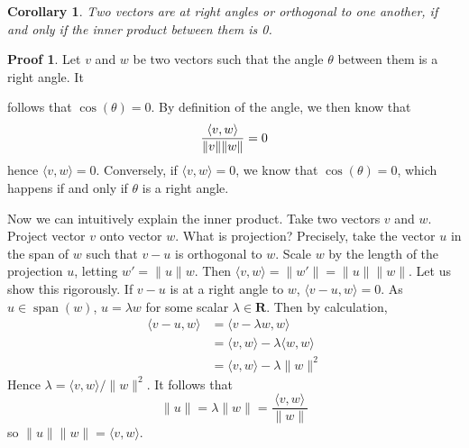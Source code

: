 \documentclass[12pt]{amsbook}
\theoremstyle{plain}
\newtheorem{corollary}[theorem]{Corollary}
\theoremstyle{definition}
\newtheorem*{prf}{Proof}
\DeclareMathOperator{\spn}{span}
\DeclarePairedDelimiter{\inner}{\langle}{\rangle}
\begin{document}
\begin{corollary}
  Two vectors are at right angles or orthogonal to one another, if and only if the inner product between them is 0.
\end{corollary}
\begin{prf}
  Let $v$ and $w$ be two vectors such that the angle $\theta$ between them is a right angle. It 
  \theoremstyle{definition}follows that $\cos(\theta) = 0$. By definition of the angle, we then know that
  \[ \frac{\inner{v, w}}{\|v\|\|w\|} = 0 \]
  hence $\langle v, w \rangle = 0$. Conversely, if $\langle v, w \rangle = 0$, we know that $\cos(\theta) = 0$, which happens if and only if $\theta$ is a right angle.
\end{prf}

Now we can intuitively explain the inner product. Take two vectors $v$ and $w$. Project vector $v$ onto vector $w$. What is projection? Precisely, take the vector $u$ in the span of $w$ such that $v - u$ is orthogonal to $w$. Scale $w$ by the length of the projection $u$, letting $w' = \|u\| w$. Then $\langle v, w \rangle = \| w' \| = \| u \| \| w \|$. Let us show this rigorously. If $v - u$ is at a right angle to $w$, $\langle v - u, w \rangle = 0$. As $u \in \spn(w)$, $u = \lambda w$ for some scalar $\lambda \in \mathbf{R}$. Then by calculation,
%
\begin{align*}
  \langle v - u, w \rangle &= \langle v - \lambda w, w \rangle\\
                           &= \langle v, w \rangle - \lambda \langle w, w \rangle\\
                           &= \langle v, w \rangle - \lambda \|w\|^2
\end{align*}
%
Hence $\lambda = \langle v, w \rangle/\|w\|^2$. It follows that
%
\[ \|u\| = \lambda \| w \| = \frac{\langle v, w \rangle}{\|w\|} \]
%
so $\|u\|\|w\| = \langle v, w \rangle$.

\begin{center}
\end{center}
\end{document}
